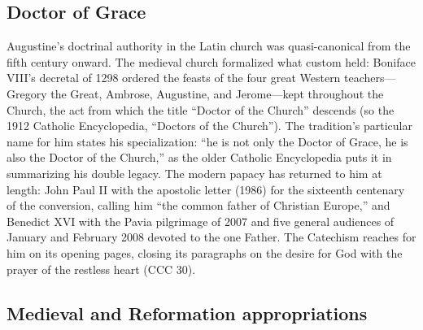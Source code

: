 
\subsection{Doctor of Grace}

Augustine's doctrinal authority in the Latin church was quasi-canonical
from the fifth century onward. The medieval church formalized what custom
held: Boniface VIII's decretal of 1298 ordered the feasts of the four great
Western teachers---Gregory the Great, Ambrose, Augustine, and Jerome---kept
throughout the Church, the act from which the title ``Doctor of the
Church'' descends (so the 1912 Catholic Encyclopedia, ``Doctors of the
Church''). The tradition's particular name for him states his
specialization: ``he is not only the Doctor of Grace, he is also the Doctor
of the Church,'' as the older Catholic Encyclopedia puts it in summarizing
his double legacy. The modern papacy has returned to him at length: John
Paul II with the apostolic letter  (1986) for
the sixteenth centenary of the conversion, calling him ``the common father
of Christian Europe,'' and Benedict XVI with the Pavia pilgrimage of 2007
and five general audiences of January and February 2008 devoted to the one
Father. The Catechism reaches for him
on its opening pages, closing its paragraphs on the desire for God with the
prayer of the restless heart (CCC 30).

\subsection{Medieval and Reformation appropriations}

